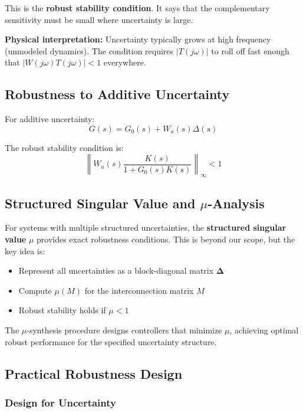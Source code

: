 This is the \textbf{robust stability condition}. It says that the complementary sensitivity must be small where uncertainty is large.

\textbf{Physical interpretation:} Uncertainty typically grows at high frequency (unmodeled dynamics). The condition requires $|T(j\omega)|$ to roll off fast enough that $|W(j\omega)T(j\omega)| < 1$ everywhere.

\subsection{Robustness to Additive Uncertainty}

For additive uncertainty:
\begin{equation}
G(s) = G_0(s) + W_a(s)\Delta(s)
\label{eq:add_uncertainty}
\end{equation}

The robust stability condition is:
\begin{equation}
\boxed{\left\|W_a(s)\frac{K(s)}{1 + G_0(s)K(s)}\right\|_{\infty} < 1}
\label{eq:robust_stability_add}
\end{equation}

\subsection{Structured Singular Value and $\mu$-Analysis}

For systems with multiple structured uncertainties, the \textbf{structured singular value} $\mu$ provides exact robustness conditions. This is beyond our scope, but the key idea is:

\begin{itemize}
    \item Represent all uncertainties as a block-diagonal matrix $\boldsymbol{\Delta}$
    \item Compute $\mu(M)$ for the interconnection matrix $M$
    \item Robust stability holds if $\mu < 1$
\end{itemize}

The $\mu$-synthesis procedure designs controllers that minimize $\mu$, achieving optimal robust performance for the specified uncertainty structure.

\subsection{Practical Robustness Design}

\subsubsection{Design for Uncertainty}

